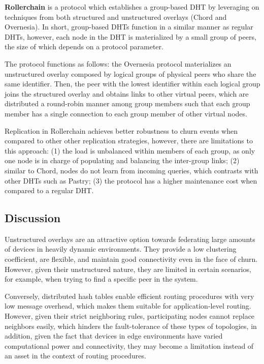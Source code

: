 \textbf{Rollerchain} \cite{rollerchain} is a protocol which establishes a group-based DHT by leveraging on techniques from both structured and unstructured  overlays (Chord and Overnesia). In short, group-based DHTs function in a similar manner as regular DHTs, however, each node in the DHT is materialized by a small group of peers, the size of which depends on a protocol parameter. 

The protocol functions as follows: the Overnesia protocol materializes an unstructured overlay composed by logical groups of physical peers who share the same identifier. Then, the peer with the lowest identifier within each logical group joins the structured overlay and obtains links to other virtual peers, which are distributed a round-robin manner among group members such that each group member has a single connection to each group member of other virtual nodes.

Replication in Rollerchain achieves better robustness to churn events when compared to other other replication strategies, however, there are limitations to this approach: (1) the load is unbalanced within members of each group, as only one node  is in charge of populating and balancing the inter-group links; (2) similar to Chord, nodes do not learn from incoming queries, which contrasts with other DHTs such as Pastry; (3) the protocol has a higher maintenance cost when compared to a regular DHT.

\subsection{Discussion}

Unstructured overlays are an attractive option towards federating large amounts of devices in heavily dynamic environments. They provide a low clustering coefficient, are flexible, and maintain good connectivity even in the face of churn. However, given their unstructured nature, they are limited in certain scenarios, for example, when trying to find a specific peer in the system.

Conversely, distributed hash tables enable efficient routing procedures with very low message overhead, which makes them suitable for application-level routing. However, given their strict neighboring rules, participating nodes cannot replace neighbors easily, which hinders the fault-tolerance of these types of topologies, in addition, given the fact that devices in edge environments have varied computational power and connectivity, they may become a limitation instead of an asset in the context of routing procedures. 



